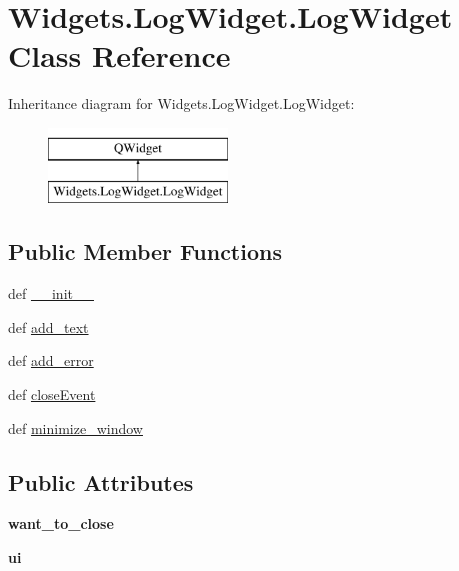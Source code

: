 \hypertarget{classWidgets_1_1LogWidget_1_1LogWidget}{\section{Widgets.\-Log\-Widget.\-Log\-Widget Class Reference}
\label{classWidgets_1_1LogWidget_1_1LogWidget}
}
Inheritance diagram for Widgets.\-Log\-Widget.\-Log\-Widget\-:\begin{figure}[H]
\begin{center}
\leavevmode
\includegraphics[height=2.000000cm]{classWidgets_1_1LogWidget_1_1LogWidget}
\end{center}
\end{figure}
\subsection*{Public Member Functions}
\begin{DoxyCompactItemize}
\item 
def \hyperlink{classWidgets_1_1LogWidget_1_1LogWidget_aa1b8db4cd22cd4cc07afbb63827c31d2}{\-\_\-\-\_\-init\-\_\-\-\_\-}
\item 
def \hyperlink{classWidgets_1_1LogWidget_1_1LogWidget_a2dbd9d8ae20f2a425a7a60dd32df1c3c}{add\-\_\-text}
\item 
def \hyperlink{classWidgets_1_1LogWidget_1_1LogWidget_a645e29634e323e67c44a0a5a9aa861f0}{add\-\_\-error}
\item 
def \hyperlink{classWidgets_1_1LogWidget_1_1LogWidget_a3b0a07e0e25fce9a0acea9efdbffcf21}{close\-Event}
\item 
def \hyperlink{classWidgets_1_1LogWidget_1_1LogWidget_a75cbcdbf6f6cba8fbc6455da1e52f922}{minimize\-\_\-window}
\end{DoxyCompactItemize}
\subsection*{Public Attributes}
\begin{DoxyCompactItemize}
\item 
\hypertarget{classWidgets_1_1LogWidget_1_1LogWidget_af3c7e4a559c5f9a41f40a69a6bc5864d}{{\bfseries want\-\_\-to\-\_\-close}}\label{classWidgets_1_1LogWidget_1_1LogWidget_af3c7e4a559c5f9a41f40a69a6bc5864d}

\item 
\hypertarget{classWidgets_1_1LogWidget_1_1LogWidget_a544043ac1e0346a04231fd07c49484bc}{{\bfseries ui}}\label{classWidgets_1_1LogWidget_1_1LogWidget_a544043ac1e0346a04231fd07c49484bc}

\end{DoxyCompactItemize}


